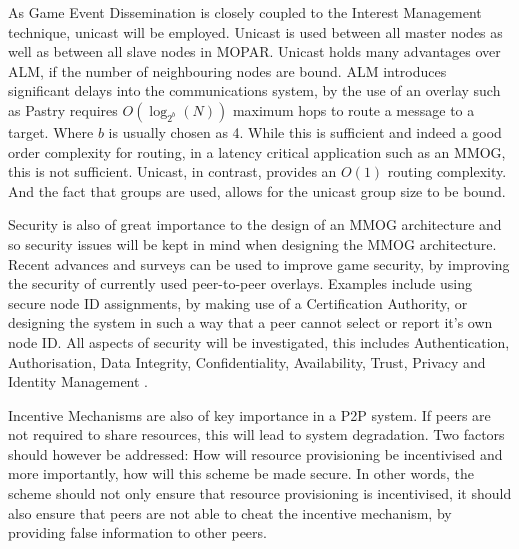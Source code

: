 \documentclass[journal,oneside,a4paper,onecolumn]{IEEEtran}
\begin{document}
As Game Event Dissemination is closely coupled to the Interest Management technique, unicast will be employed. Unicast is used between all master nodes as well as between all slave nodes in MOPAR. Unicast holds many advantages over ALM, if the number of neighbouring nodes are bound. ALM introduces significant delays into the communications system, by the use of an overlay such as Pastry requires $O(\log_{2^b}(N))$ maximum hops to route a message to a target. Where $b$ is usually chosen as 4. While this is sufficient and indeed a good order complexity for routing, in a latency critical application such as an MMOG, this is not sufficient. Unicast, in contrast, provides an $O(1)$ routing complexity. And the fact that groups are used, allows for the unicast group size to be bound.

Security is also of great importance to the design of an MMOG architecture and so security issues will be kept in mind when designing the MMOG architecture. Recent advances and surveys can be used to improve game security, by improving the security of currently used peer-to-peer overlays. Examples include using secure node ID assignments, by making use of a Certification Authority, or designing the system in such a way that a peer cannot select or report it's own node ID. All aspects of security will be investigated, this includes Authentication, Authorisation, Data Integrity, Confidentiality, Availability, Trust, Privacy and Identity Management \cite{distributed_systems_security}.

Incentive Mechanisms are also of key importance in a P2P system. If peers are not required to share resources, this will lead to system degradation. Two factors should however be addressed: How will resource provisioning be incentivised and more importantly, how will this scheme be made secure. In other words, the scheme should not only ensure that resource provisioning is incentivised, it should also ensure that peers are not able to cheat the incentive mechanism, by providing false information to other peers.
\end{document}

